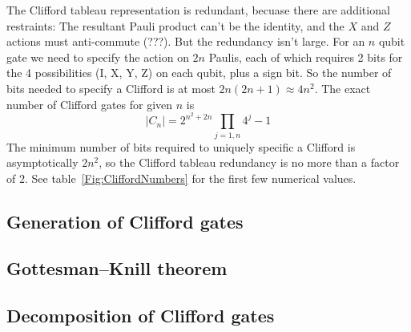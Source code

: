 The Clifford tableau representation is redundant, becuase there are additional restraints: The resultant Pauli product can't be the identity, and the $X$ and $Z$ actions must anti-commute (???). But the redundancy isn't large. For an $n$ qubit gate we need to specify the action on $2n$ Paulis, each of which requires 2 bits for the 4 possibilities (I, X, Y, Z) on each qubit, plus a sign bit. So the number of bits needed to specify a Clifford is at most $2n(2n+1)\approx 4n^2$. 
The exact number of Clifford gates for given $n$ is
\[
|C_n| = 2^{n^2+2n} \prod_{j=1,n} 4^j-1
\]
The minimum number of bits required to uniquely specific a Clifford is asymptotically $2n^2$, so the Clifford tableau redundancy is no more than a factor of 2. See table~\ref{Fig:CliffordNumbers} for the first few numerical values.


\subsection{Generation of Clifford gates}


\subsection{Gottesman–Knill theorem}


\subsection{Decomposition of Clifford gates}
